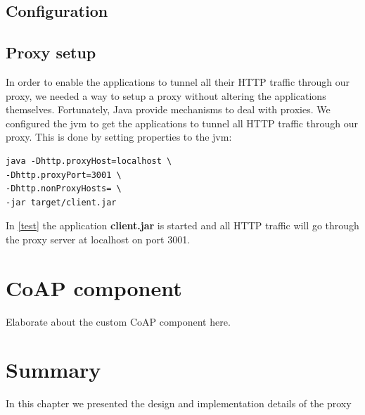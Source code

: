\subsection{Configuration}




\subsection{Proxy setup}

In order to enable the applications to tunnel all their HTTP traffic through our
proxy, we needed a way to setup a proxy without altering the applications
themselves. Fortunately, Java provide mechanisms to deal with
proxies\cite{oracle-proxy}. We configured the \gls{jvm} to get the applications
to tunnel all HTTP traffic through our proxy. This is done by setting properties
to the \gls{jvm}:


\begin{lstlisting}[frame=single, caption="Setting a proxy on the \gls{jvm}", label=test]
java -Dhttp.proxyHost=localhost \
-Dhttp.proxyPort=3001 \
-Dhttp.nonProxyHosts= \
-jar target/client.jar
\end{lstlisting}

In \cref{test} the application \textbf{client.jar} is started and all HTTP
traffic will go through the proxy server at localhost on port 3001.


\section{CoAP component}

Elaborate about the custom CoAP component here.

\section{Summary}

In this chapter we presented the design and implementation details of the proxy
